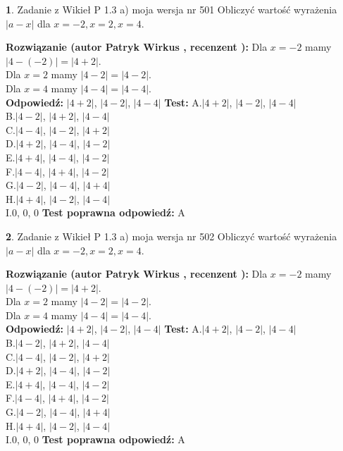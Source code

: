 \documentclass[12pt, a4paper]{article}
\theoremstyle{definition} %
\newtheorem{zad}{}
\newcommand{\zadStart}[1]{\begin{zad}#1\newline}
\newcommand{\zadStop}{\end{zad}}
\newcommand{\rozwStart}[2]{\noindent \textbf{Rozwiązanie (autor #1 , recenzent #2): }\newline}
\newcommand{\rozwStop}{\newline}
\newcommand{\odpStart}{\noindent \textbf{Odpowiedź:}\newline}
\newcommand{\odpStop}{\newline}
\newcommand{\testStart}{\noindent \textbf{Test:}\newline}
\newcommand{\testStop}{\newline}
\newcommand{\kluczStart}{\noindent \textbf{Test poprawna odpowiedź:}\newline}
\newcommand{\kluczStop}{\newline}
\begin{document}
\zadStart{Zadanie z Wikieł P 1.3 a) moja wersja nr 501}
Obliczyć wartość wyrażenia $|a - x|$ dla $x=-2,x=2,x=4$.
\zadStop
\rozwStart{Patryk Wirkus}{}
Dla $x = -2$ mamy $|4 - (-2)| = |4 + 2|$.\\
Dla $x = 2$ mamy $|4 - 2| = |4 - 2|$.\\
Dla $x = 4$ mamy $|4 - 4| = |4 - 4|$.\\
\rozwStop
\odpStart
$|4 + 2|$, $|4 - 2|$, $|4 - 4|$
\odpStop
\testStart
A.$|4 + 2|$, $|4 - 2|$, $|4 - 4|$\\
B.$|4 - 2|$, $|4 + 2|$, $|4 - 4|$\\
C.$|4 - 4|$, $|4 - 2|$, $|4 + 2|$\\
D.$|4 + 2|$, $|4 - 4|$, $|4 - 2|$\\
E.$|4 + 4|$, $|4 - 4|$, $|4 - 2|$\\
F.$|4 - 4|$, $|4 + 4|$, $|4 - 2|$\\
G.$|4 - 2|$, $|4 - 4|$, $|4 + 4|$\\
H.$|4 + 4|$, $|4 - 2|$, $|4 - 4|$\\
I.$0$, $0$, $0$
\testStop
\kluczStart
A
\kluczStop



\zadStart{Zadanie z Wikieł P 1.3 a) moja wersja nr 502}
Obliczyć wartość wyrażenia $|a - x|$ dla $x=-2,x=2,x=4$.
\zadStop
\rozwStart{Patryk Wirkus}{}
Dla $x = -2$ mamy $|4 - (-2)| = |4 + 2|$.\\
Dla $x = 2$ mamy $|4 - 2| = |4 - 2|$.\\
Dla $x = 4$ mamy $|4 - 4| = |4 - 4|$.\\
\rozwStop
\odpStart
$|4 + 2|$, $|4 - 2|$, $|4 - 4|$
\odpStop
\testStart
A.$|4 + 2|$, $|4 - 2|$, $|4 - 4|$\\
B.$|4 - 2|$, $|4 + 2|$, $|4 - 4|$\\
C.$|4 - 4|$, $|4 - 2|$, $|4 + 2|$\\
D.$|4 + 2|$, $|4 - 4|$, $|4 - 2|$\\
E.$|4 + 4|$, $|4 - 4|$, $|4 - 2|$\\
F.$|4 - 4|$, $|4 + 4|$, $|4 - 2|$\\
G.$|4 - 2|$, $|4 - 4|$, $|4 + 4|$\\
H.$|4 + 4|$, $|4 - 2|$, $|4 - 4|$\\
I.$0$, $0$, $0$
\testStop
\kluczStart
A
\kluczStop
\end{document}
